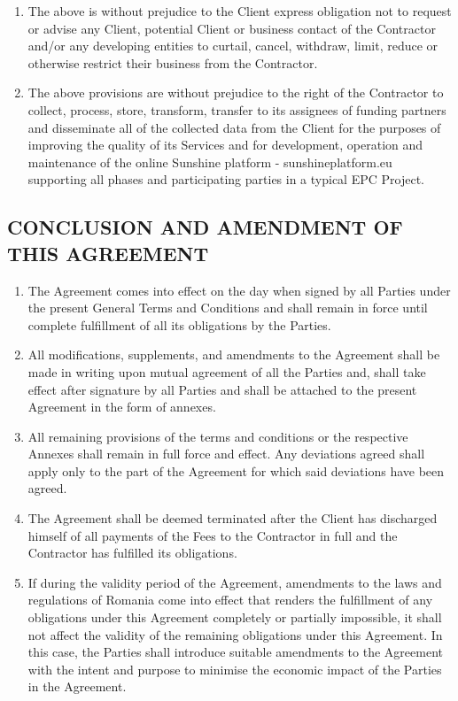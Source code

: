 \begin{multicols}{2}
\begin{enumerate}
	\item	The above is without prejudice to the Client express obligation not to request or advise any Client, potential Client or business contact of the Contractor and/or any developing entities to curtail, cancel, withdraw, limit, reduce or otherwise restrict their business from the Contractor.
	\item	The above provisions are without prejudice to the right of the Contractor to collect, process, store, transform, transfer to its assignees of funding partners and disseminate all of the collected data from the Client for the purposes of improving the quality of its Services and for development, operation and maintenance of the online Sunshine platform - sunshineplatform.eu supporting all phases and participating parties in a typical EPC Project.
\end{enumerate}

\subsection{CONCLUSION AND AMENDMENT OF THIS AGREEMENT}
\begin{enumerate}
	\item	The Agreement comes into effect on the day when signed by all Parties under the present General Terms and Conditions and shall remain in force until complete fulfillment of all its obligations by the Parties.
	\item	All modifications, supplements, and amendments to the Agreement shall be made in writing upon mutual agreement of all the Parties and, shall take effect after signature by all Parties and shall be attached to the present Agreement in the form of annexes.
	\item	All remaining provisions of the terms and conditions or the respective Annexes shall remain in full force and effect. Any deviations agreed shall apply only to the part of the Agreement for which said deviations have been agreed.
	\item	The Agreement shall be deemed terminated after the Client has discharged himself of all payments of the Fees to the Contractor in full and the Contractor has fulfilled its obligations.
	\item	If during the validity period of the Agreement, amendments to the laws and regulations of Romania come into effect that renders the fulfillment of any obligations under this Agreement completely or partially impossible, it shall not affect the validity of the remaining obligations under this Agreement. In this case, the Parties shall introduce suitable amendments to the Agreement with the intent and purpose to minimise the economic impact of the Parties in the Agreement.
\end{enumerate}


\end{multicols}
